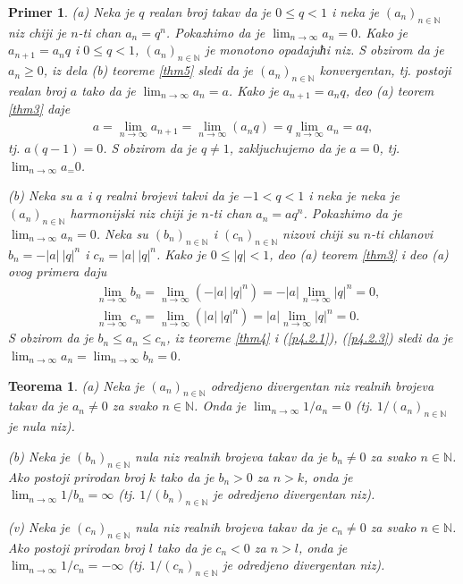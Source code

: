\documentclass[11pt,a4paper]{article}
\newtheorem{thm}{Teorema}[section]
\newtheorem{pri}{Primer}[section]
\begin{document}
\begin{pri}
(a) Neka je $q$ realan broj takav da je $0\leq q<1$
i neka je $(a_n)_{n\in\mathbb{N}}$ niz chiji je $n$-ti chan 
$a_n=q^n$. 
Pokazhimo da je $\displaystyle\lim_{n\rightarrow\infty}a_n=0$. 
Kako je $a_{n+1}=a_n q$ i $0\leq q<1$, 
$(a_n)_{n\in\mathbb{N}}$ je monotono opadajuћi niz. 
S obzirom da je $a_n\geq 0$, iz dela (b) teoreme \ref{thm5} 
sledi da je $(a_n)_{n\in\mathbb{N}}$ konvergentan, 
tj. postoji realan broj $a$ tako da je 
$\displaystyle\lim_{n\rightarrow\infty}a_n=a$. 
Kako je $a_{n+1}=a_n q$, deo (a) teorem \ref{thm3} daje 
\begin{align*}
    a
    =
    \lim_{n\rightarrow\infty}a_{n+1}
    =
    \lim_{n\rightarrow\infty}(a_{n}q)
    =
    q\lim_{n\rightarrow\infty}a_{n}
    =
    aq, 
\end{align*}
tj. $a(q-1)=0$. 
S obzirom da je $q\neq 1$, 
zakljuchujemo da je $a=0$, 
tj. $\displaystyle\lim_{n\rightarrow\infty}a_=0$. 

(b) Neka su $a$ i $q$ realni brojevi takvi da je $-1<q<1$ 
i neka je neka je $(a_n)_{n\in\mathbb{N}}$ harmonijski 
niz chiji je $n$-ti chan 
$a_n=aq^n$. 
Pokazhimo da je $\displaystyle\lim_{n\rightarrow\infty}a_n=0$. 
Neka su $(b_n)_{n\in\mathbb{N}}$ i $(c_n)_{n\in\mathbb{N}}$
nizovi chiji su $n$-ti chlanovi 
$b_n=-|a|\:|q|^n$ i $c_n=|a|\:|q|^n$. 
Kako je $0\leq |q|<1$, deo (a) teorem \ref{thm3} 
i deo (a) ovog primera daju 
\begin{align}
    &\label{p4.2.1}
    \lim_{n\rightarrow\infty}b_n
    =
    \lim_{n\rightarrow\infty}(-|a|\:|q|^n)
    =
    -|a|\lim_{n\rightarrow\infty}|q|^n
    =
    0, 
    \\
    &\label{p4.2.3}
    \lim_{n\rightarrow\infty}c_n
    =
    \lim_{n\rightarrow\infty}(|a|\:|q|^n)
    =
    |a|\lim_{n\rightarrow\infty}|q|^n
    =
    0. 
\end{align}
S obzirom da je $b_n\leq a_n\leq c_n$, 
iz teoreme \ref{thm4} i (\ref{p4.2.1}), (\ref{p4.2.3})
sledi da je 
$\displaystyle\lim_{n\rightarrow\infty}a_n=
\displaystyle\lim_{n\rightarrow\infty}b_n=0$. 
\end{pri}

\begin{thm}\label{thm6}
(a) Neka je $(a_n)_{n\in\mathbb{N}}$ odredjeno divergentan niz 
realnih brojeva takav da je $a_n\neq 0$ za svako $n\in\mathbb{N}$.
Onda je $\displaystyle\lim_{n\rightarrow\infty}1/a_n=0$
(tj. $1/(a_n)_{n\in\mathbb{N}}$ je nula niz). 

(b) Neka je $(b_n)_{n\in\mathbb{N}}$ nula niz 
realnih brojeva takav da je $b_n\neq 0$ za svako $n\in\mathbb{N}$. 
Ako postoji prirodan broj $k$ tako da je $b_n>0$ za $n>k$, 
onda je $\displaystyle\lim_{n\rightarrow\infty}1/b_n=\infty$
(tj. $1/(b_n)_{n\in\mathbb{N}}$ je odredjeno divergentan niz).

(v) Neka je $(c_n)_{n\in\mathbb{N}}$ nula niz 
realnih brojeva takav da je $c_n\neq 0$ za svako $n\in\mathbb{N}$. 
Ako postoji prirodan broj $l$ tako da je $c_n<0$ za $n>l$, 
onda je $\displaystyle\lim_{n\rightarrow\infty}1/c_n=-\infty$
(tj. $1/(c_n)_{n\in\mathbb{N}}$ je odredjeno divergentan niz).
\end{thm}
\end{document}
